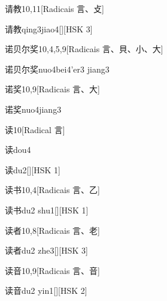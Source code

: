 \begin{entry}{请教}{10,11}[Radicais ⾔、⽁]
  \begin{phonetics}{请教}{qing3jiao4}[][HSK 3]
  \end{phonetics}
\end{entry}

\begin{entry}{诺贝尔奖}{10,4,5,9}[Radicais ⾔、⾙、⼩、⼤]
  \begin{phonetics}{诺贝尔奖}{nuo4bei4'er3 jiang3}
  \end{phonetics}
\end{entry}

\begin{entry}{诺奖}{10,9}[Radicais ⾔、⼤]
  \begin{phonetics}{诺奖}{nuo4jiang3}
  \end{phonetics}
\end{entry}

\begin{entry}{读}{10}[Radical ⾔]
  \begin{phonetics}{读}{dou4}
  \end{phonetics}
  \begin{phonetics}{读}{du2}[][HSK 1]
  \end{phonetics}
\end{entry}

\begin{entry}{读书}{10,4}[Radicais ⾔、⼄]
  \begin{phonetics}{读书}{du2 shu1}[][HSK 1]
  \end{phonetics}
\end{entry}

\begin{entry}{读者}{10,8}[Radicais ⾔、⽼]
  \begin{phonetics}{读者}{du2 zhe3}[][HSK 3]
  \end{phonetics}
\end{entry}

\begin{entry}{读音}{10,9}[Radicais ⾔、⾳]
  \begin{phonetics}{读音}{du2 yin1}[][HSK 2]
  \end{phonetics}
\end{entry}

